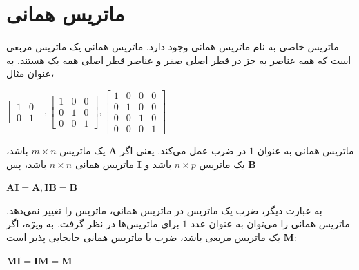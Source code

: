 \section{\textbf{ماتریس همانی}}
\label{sec:2.4}
{
    \Large
    \begin{spacing}{1.5}
        ماتریس خاصی به نام ماتریس همانی وجود دارد.
        ماتریس همانی یک ماتریس مربعی است که همه عناصر به جز در قطر اصلی صفر و عناصر قطر اصلی همه یک هستند.
        به عنوان مثال،
        \begin{center}
            $\begin{bmatrix}
                 1 & 0 \\
                 0 & 1
            \end{bmatrix}, \begin{bmatrix}
                               1 & 0 & 0 \\
                               0 & 1 & 0 \\
                               0 & 0 & 1
            \end{bmatrix}, \begin{bmatrix}
                               1 & 0 & 0 & 0 \\
                               0 & 1 & 0 & 0 \\
                               0 & 0 & 1 & 0 \\
                               0 & 0 & 0 & 1
            \end{bmatrix}$
        \end{center}

        ماتریس همانی به عنوان $1$ در ضرب عمل می‌کند.
        یعنی اگر $\textbf{A}$ یک ماتریس $m\times n$ باشد، $\textbf{B}$ یک ماتریس $n\times p$ باشد و $\textbf{I}$ ماتریس همانی $n\times n$ باشد، پس

        \begin{center}
            $\textbf{AI}=\textbf{A}, \textbf{IB}=\textbf{B}$
        \end{center}

        به عبارت دیگر، ضرب یک ماتریس در ماتریس همانی، ماتریس را تغییر نمی‌دهد.
        ماتریس همانی را می‌توان به عنوان عدد $1$ برای ماتریس‌ها در نظر گرفت.
        به ویژه، اگر $\textbf{M}$ یک ماتریس مربعی باشد، ضرب با ماتریس همانی جابجایی پذیر است:

        \begin{center}
            $\textbf{MI}=\textbf{IM}=\textbf{M}$
        \end{center}


\end{spacing}}
